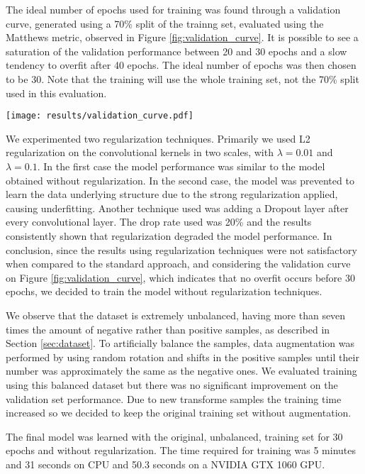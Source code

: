         The ideal number of epochs used for training was found through a validation curve, generated using a 70\% split of the trainng set, evaluated using the Matthews metric, observed in Figure \ref{fig:validation_curve}. It is possible to see a saturation of the validation performance between 20 and 30 epochs and a slow tendency to overfit after 40 epochs. The ideal number of epochs was then chosen to be 30. Note that the training will use the whole training set, not the 70\% split used in this evaluation.

        \begin{figure*}[!t]
        \centering
        \texttt{[image: results/validation\_curve.pdf]}
        \caption{Validation curve. 70\% split on training set.}
        \label{fig:validation_curve}
        \end{figure*}

        We experimented two regularization techniques. Primarily we used L2 regularization on the convolutional kernels in two scales, with $\lambda = 0.01$ and $\lambda = 0.1$. In the first case the model performance was similar to the model obtained without regularization. In the second case, the model was prevented to learn the data underlying structure due to the strong regularization applied, causing underfitting. Another technique used was adding a Dropout layer after every convolutional layer. The drop rate used was 20\% and the results consistently shown that regularization degraded the model performance. In conclusion, since the results using regularization techniques were not satisfactory when compared to the standard approach, and considering the validation curve on Figure \ref{fig:validation_curve}, which indicates that no overfit occurs before 30 epochs, we decided to train the model without regularization techniques.

        We observe that the dataset is extremely unbalanced, having more than seven times the amount of negative rather than positive samples, as described in Section \ref{sec:dataset}. To artificially balance the samples, data augmentation was performed by using random rotation and shifts in the positive samples until their number was approximately the same as the negative ones. We evaluated training using this balanced dataset but there was no significant improvement on the validation set performance. Due to new transforme samples the training time increased so we decided to keep the original training set without augmentation.

	The final model was learned with the original, unbalanced, training set for 30 epochs and without regularization. The time required for training was 5 minutes and 31 seconds on CPU and 50.3 seconds on a NVIDIA GTX 1060 GPU.

